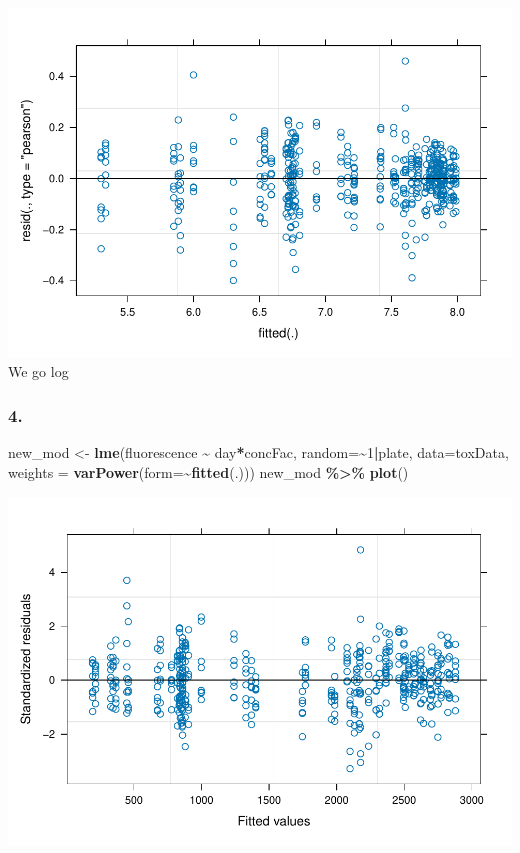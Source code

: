 \documentclass[
]{article}
\newenvironment{Shaded}{\begin{snugshade}}{\end{snugshade}}
\newcommand{\AttributeTok}[1]{\textcolor[rgb]{0.13,0.29,0.53}{#1}}
\newcommand{\DecValTok}[1]{\textcolor[rgb]{0.00,0.00,0.81}{#1}}
\newcommand{\FunctionTok}[1]{\textcolor[rgb]{0.13,0.29,0.53}{\textbf{#1}}}
\newcommand{\NormalTok}[1]{#1}
\newcommand{\OtherTok}[1]{\textcolor[rgb]{0.56,0.35,0.01}{#1}}
\newcommand{\SpecialCharTok}[1]{\textcolor[rgb]{0.81,0.36,0.00}{\textbf{#1}}}
\begin{document}
\includegraphics{for_markdown_files/figure-latex/unnamed-chunk-4-3.pdf}
We go log

\hypertarget{section-2}{%
\subsubsection{4.}\label{section-2}}

\begin{Shaded}
\begin{Highlighting}[]
\NormalTok{new\_mod }\OtherTok{\textless{}{-}} \FunctionTok{lme}\NormalTok{(fluorescence }\SpecialCharTok{\textasciitilde{}}\NormalTok{ day}\SpecialCharTok{*}\NormalTok{concFac, }\AttributeTok{random=}\SpecialCharTok{\textasciitilde{}}\DecValTok{1}\SpecialCharTok{|}\NormalTok{plate, }\AttributeTok{data=}\NormalTok{toxData,}
\AttributeTok{weights =} \FunctionTok{varPower}\NormalTok{(}\AttributeTok{form=}\SpecialCharTok{\textasciitilde{}}\FunctionTok{fitted}\NormalTok{(.)))}
\NormalTok{new\_mod }\SpecialCharTok{\%\textgreater{}\%} \FunctionTok{plot}\NormalTok{()}
\end{Highlighting}
\end{Shaded}

\includegraphics{for_markdown_files/figure-latex/unnamed-chunk-5-1.pdf}
\end{document}

